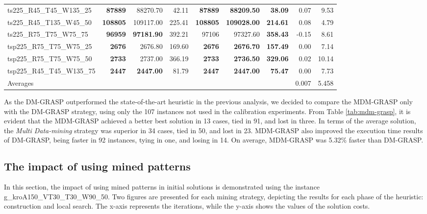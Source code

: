 \documentclass{singlecol-new}
\begin{document}
\begin{scriptsize}
\begin{longtable}{lrrrrrrrr}
		ts225\_R45\_T45\_W135\_25 & \textbf{87889} & 88270.70 & 42.11 & \textbf{87889} & \textbf{88209.50} & \textbf{38.09} & 0.07 & 9.53 \\
		ts225\_R45\_T135\_W45\_50 & \textbf{108805} & 109117.00 & 225.41 & \textbf{108805} & \textbf{109028.00} & \textbf{214.61} & 0.08 & 4.79 \\
		ts225\_R75\_T75\_W75\_75 & \textbf{96959} & \textbf{97181.90} & 392.21 & 97106 & 97327.60 & \textbf{358.43} & -0.15 & 8.61 \\
		tsp225\_R75\_T75\_W75\_25 & \textbf{2676} & 2676.80 & 169.60 & \textbf{2676} & \textbf{2676.70} & \textbf{157.49} & 0.00 & 7.14 \\
		tsp225\_R75\_T75\_W75\_50 & \textbf{2733} & 2737.00 & 366.19 & \textbf{2733} & \textbf{2736.50} & \textbf{329.06} & 0.02 & 10.14 \\
		tsp225\_R45\_T45\_W135\_75 & \textbf{2447} & \textbf{2447.00} & 81.79 & \textbf{2447} & \textbf{2447.00} & \textbf{75.47} & 0.00 & 7.73 \\
		\hline
  Averages &  &  &  &  &  &  & 0.007
 & 5.458
 \\
		\hline
	\end{longtable}
\end{scriptsize}

As the DM-GRASP outperformed the state-of-the-art heuristic in the previous analysis, we decided to compare the MDM-GRASP only with the DM-GRASP strategy, using only the 107 instances not used in the calibration experiments. From Table \ref{tab:mdm-grasp}, it is evident that the MDM-GRASP achieved a better best solution in 13 cases, tied in 91, and lost in three. In terms of the average solution, the \textit{Multi Data-mining} strategy was superior in 34 cases, tied in 50, and lost in 23. MDM-GRASP also improved the execution time results of DM-GRASP, being faster in 92 instances, tying in one, and losing in 14. On average, MDM-GRASP was 5.32\% faster than DM-GRASP.


\subsection{The impact of using mined patterns}

In this section, the impact of using mined patterns in initial solutions is demonstrated using the instance g\_kroA150\_VT30\_T30\_W90\_50. Two figures are presented for each mining strategy, depicting the results for each phase of the heuristic: construction and local search. The x-axis represents the iterations, while the y-axis shows the values of the solution costs.
\end{document}
